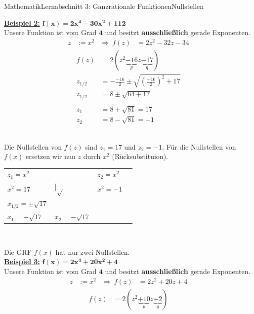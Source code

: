 \documentclass[11pt,twocolumn,oneside,openany,headings=optiontotoc,11pt,numbers=noenddot]{article}
\begin{document}
\begin{worksheet}{Mathematik}{Lernabschnitt 3: Ganzrationale Funktionen}{Nullstellen}
		\par\noindent
		\textbf{\underline{Beispiel 2:}} \(\mathbf{f(x) = 2x^4 -30x^2 +112}\)\\
		Unsere Funktion ist vom Grad \(\mathbf{4}\) und besitzt \textbf{ausschließlich} gerade Exponenten.
		\begin{align*}
			z & := x^2 & \Rightarrow\ f(z) & = 2z^2 -32z - 34
		\end{align*}
		\begin{align*}			
			f(z) & = 2(z^2 \underbrace{-16}_{p}z \underbrace{-17}_{q})\\
			z_{1/2} & = -\frac{-16}{2} \pm \sqrt{\left(\frac{-16}{2}\right)^2 + 17}\\
			z_{1/2} & = 8 \pm \sqrt{64 + 17}\\
			\\
			z_1 & = 8 + \sqrt{81} = 17\\
			z_2 & = 8 - \sqrt{81} = -1
		\end{align*}\\
		\par\noindent
		Die Nullstellen von \(f(z)\) sind \(z_1=17\) und \(z_2=-1\). Für die Nullstellen von \(f(x)\) ersetzen wir nun \(z\) durch \(x^2\) (Rücksubstituion).\\
		\par\noindent
		\begin{tabularx}{0.48\textwidth}{Ml|Ml}
			\(z_1 = x^2\) & & \(z_2 = x^2\) &\\
			\(x^2 = 17\) & |\(\sqrt{}\) & \(x^2 = -1\) & \lightning\\
			\(x_{1/2} = \pm \sqrt{17}\) & & \\
			\colorbox{green!10}{\(x_1 = +\sqrt{17}\)} & \colorbox{green!10}{\(x_2 = -\sqrt{17}\)} & \\
		\end{tabularx}\\		
		\par\noindent
		Die GRF \(f(x)\) hat nur zwei Nullstellen.\\
		\textbf{\underline{Beispiel 3:}} \(\mathbf{f(x) = 2x^4 + 20x^2 + 4}\)\\
		Unsere Funktion ist vom Grad \(\mathbf{4}\) und besitzt \textbf{ausschließlich} gerade Exponenten.
		\begin{align*}
		z & := x^2 & \Rightarrow\ f(z) & = 2z^2 + 20z + 4
		\end{align*}
		\begin{align*}			
		f(z) & = 2(z^2 \underbrace{+10}_{p}z \underbrace{+2}_{q})\\

\end{align*}
\end{worksheet}
\end{document}
